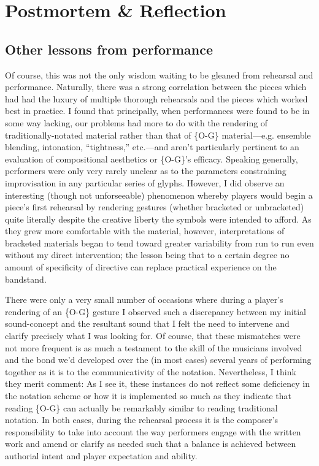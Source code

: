 \section{Postmortem \& Reflection}

    \subsection{Other lessons from performance}

    Of course, this was not the only wisdom waiting to be gleaned from rehearsal and performance. Naturally, there was a strong correlation between the pieces which had had the luxury of multiple thorough rehearsals and the pieces which worked best in practice. I found that principally, when performances were found to be in some way lacking, our problems had more to do with the rendering of traditionally-notated material rather than that of \{O-G\} material---e.g. ensemble blending, intonation, ``tightness,'' etc.---and aren't particularly pertinent to an evaluation of compositional aesthetics or \{O-G\}'s efficacy. Speaking generally, performers were only very rarely unclear as to the parameters constraining improvisation in any particular series of glyphs. However, I did observe an interesting (though not unforseeable) phenomenon whereby players would begin a piece's first rehearsal by rendering gestures (whether bracketed or unbracketed) quite literally despite the creative liberty the symbols were intended to afford. As they grew more comfortable with the material, however, interpretations of bracketed materials began to tend toward greater variability from run to run even without my direct intervention; the lesson being that to a certain degree no amount of specificity of directive can replace practical experience on the bandstand.

    There were only a very small number of occasions where during a player's rendering of an \{O-G\} gesture I observed such a discrepancy between my initial sound-concept and the resultant sound that I felt the need to intervene and clarify precisely what I was looking for. Of course, that these mismatches were not more frequent is as much a testament to the skill of the musicians involved and the bond we'd developed over the (in most cases) several years of performing together as it is to the communicativity of the notation. Nevertheless, I think they merit comment: As I see it, these instances do not reflect some deficiency in the notation scheme or how it is implemented so much as they indicate that reading \{O-G\} can actually be remarkably similar to reading traditional notation. In both cases, during the rehearsal process it is the composer's responsibility to take into account the way performers engage with the written work and amend or clarify as needed such that a balance is achieved between authorial intent and player expectation and ability. 

